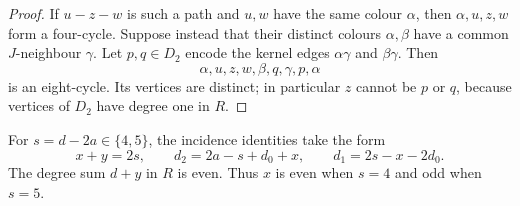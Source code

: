 \documentclass[11pt]{article}
\begin{document}
\begin{proof}
If $u-z-w$ is such a path and $u,w$ have the same colour $\alpha$, then
$\alpha,u,z,w$ form a four-cycle.  Suppose instead that their distinct
colours $\alpha,\beta$ have a common $J$-neighbour $\gamma$.  Let
$p,q\in D_2$ encode the kernel edges $\alpha\gamma$ and
$\beta\gamma$.  Then
\[
 \alpha,u,z,w,\beta,q,\gamma,p,\alpha
\]
is an eight-cycle.  Its vertices are distinct; in particular $z$ cannot be
$p$ or $q$, because vertices of $D_2$ have degree one in $R$.
\end{proof}

For $s=d-2a\in\{4,5\}$, the incidence identities take the form
\begin{equation}\label{eq:profiles}
 x+y=2s,\qquad
 d_2=2a-s+d_0+x,\qquad
 d_1=2s-x-2d_0.
\end{equation}
The degree sum $d+y$ in $R$ is even.  Thus $x$ is even when $s=4$ and odd
when $s=5$.
\end{document}

